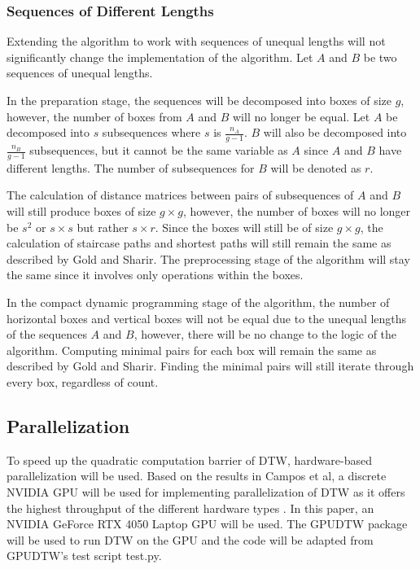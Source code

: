 \subsubsection{Sequences of Different Lengths}
Extending the algorithm to work with sequences of unequal lengths will not significantly change the implementation of the algorithm. Let $A$ and $B$ be two sequences of unequal lengths.

In the preparation stage, the sequences will be decomposed into boxes of size $g$, however, the number of boxes from $A$ and $B$ will no longer be equal. Let $A$ be decomposed into $s$ subsequences where $s$ is $\frac{n_A }{g-1}$. $B$ will also be decomposed into $\frac{n_B}{g-1}$ subsequences, but it cannot be the same variable as $A$ since $A$ and $B$ have different lengths. The number of subsequences for $B$ will be denoted as $r$.

The calculation of distance matrices between pairs of subsequences of $A$ and $B$ will still produce boxes of size $g \times g$, however, the number of boxes will no longer be $s^2$ or $s \times s$ but rather $s \times r$. Since the boxes will still be of size $g \times g$, the calculation of staircase paths and shortest paths will still remain the same as described by Gold and Sharir. The preprocessing stage of the algorithm will stay the same since it involves only operations within the boxes.

In the compact dynamic programming stage of the algorithm, the number of horizontal boxes and vertical boxes will not be equal due to the unequal lengths of the sequences $A$ and $B$, however, there will be no change to the logic of the algorithm. Computing minimal pairs for each box will remain the same as described by Gold and Sharir. Finding the minimal pairs will still iterate through every box, regardless of count.

\subsection{Parallelization}
To speed up the quadratic computation barrier of DTW, hardware-based parallelization will be used. Based on the results in Campos et al, a discrete NVIDIA GPU will be used for implementing parallelization of DTW as it offers the highest throughput of the different hardware types \cite{GPUParallelization}. In this paper, an NVIDIA GeForce RTX 4050 Laptop GPU will be used. The GPUDTW package will be used to run DTW on the GPU and the code will be adapted from GPUDTW's test script test.py.

